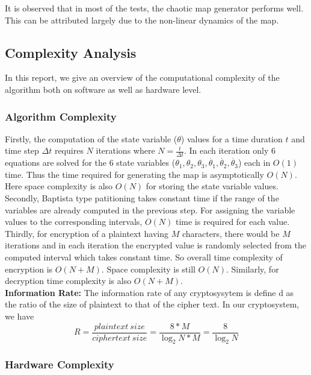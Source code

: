It is observed that in most of the tests, the chaotic map generator performs well. This can be attributed largely due to the non-linear dynamics of the map.

\subsection{Complexity Analysis}

In this report, we give an overview of the computational complexity of the algorithm both on software as well as hardware level.

\subsubsection{Algorithm Complexity}
Firstly, the computation of the state variable (${\theta}$) values for a time duration $t$ and time step $\Delta t$ requires $N$ iterations where $N= \frac{t}{\Delta t}$. In each iteration only 6 equations are solved for the 6 state variables ($\theta_{1}, \theta_{2}, \theta_{3}, \dot{\theta_{1}}, \dot{\theta_{2}}, \dot{\theta_{3}}$) each in $O(1)$ time. Thus the time required for generating the map is asymptotically $O(N)$. Here space complexity is also $O(N)$ for storing the state variable values. Secondly, Baptista type patitioning takes constant time if the range of the variables are already computed in the previous step. For assigning the variable values to the corresponding intervals, $O(N)$ time is required for each value. Thirdly, for encryption of a plaintext having $M$ characters, there would be $M$ iterations and in each iteration the encrypted value is randomly selected from the computed interval which takes constant time. So overall time complexity of encryption is $O(N+M)$. Space complexity is still $O(N)$. Similarly, for decryption time complexity is also $O(N+M)$.\\
\textbf{Information Rate:} The information rate of any cryptosysytem is define d as the ratio of the size of plaintext to that of the cipher text. In our cryptosystem, we have
\begin{equation}
R = \frac{plaintext\ size}{ciphertext\ size} = \frac{8*M}{\log_2N*M} = \frac{8}{\log_2N}
\end{equation}
\subsubsection{Hardware Complexity}
